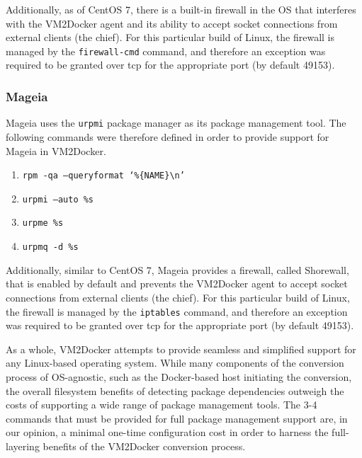 Additionally, as of CentOS 7, there is a built-in firewall in the OS that interferes with the VM2Docker agent and its ability to accept socket connections from external clients (the chief). For this particular build of Linux, the firewall is managed by the \texttt{firewall-cmd} command, and therefore an exception was required to be granted over tcp for the appropriate port (by default 49153).

\subsubsection{Mageia}
Mageia uses the \texttt{urpmi} package manager as its package management tool. The following commands were therefore defined in order to provide support for Mageia in VM2Docker.

\begin{enumerate}
\item \texttt{rpm -qa --queryformat `\%\{NAME\}\textbackslash n'}
\item \texttt{urpmi --auto \%s}
\item \texttt{urpme \%s}
\item \texttt{urpmq -d \%s}
\end{enumerate}

Additionally, similar to CentOS 7, Mageia provides a firewall, called Shorewall, that is enabled by default and prevents the VM2Docker agent to accept socket connections from external clients (the chief). For this particular build of Linux, the firewall is managed by the \texttt{iptables} command, and therefore an exception was required to be granted over tcp for the appropriate port (by default 49153).


As a whole, VM2Docker attempts to provide seamless and simplified support for any Linux-based operating system. While many components of the conversion process of OS-agnostic, such as the Docker-based host initiating the conversion, the overall filesystem benefits of detecting package dependencies outweigh the costs of supporting a wide range of package management tools. The 3-4 commands that must be provided for full package management support are, in our opinion, a minimal one-time configuration cost in order to harness the full-layering benefits of the VM2Docker conversion process.

